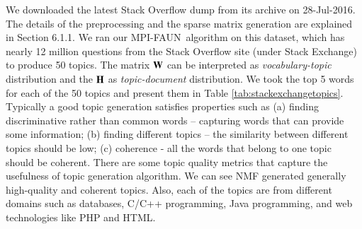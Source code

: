 \documentclass[10pt,journal,compsoc, onecolumn]{IEEEtran}
\newcommand{\ParNMF}{MPI-FAUN}
\begin{document}
We downloaded the latest Stack Overflow  dump from its archive on 28-Jul-2016. The details of 
the preprocessing and the sparse matrix generation are explained in Section 6.1.1. We ran 
our \ParNMF\ algorithm on this dataset, which has nearly 12 million questions from the Stack Overflow site (under Stack Exchange) to produce 50 topics. 
The matrix $\mathbf{W}$ can be interpreted as {\em vocabulary-topic} distribution and the 
$\mathbf{H}$ as {\em topic-document} distribution.  We took the top 5 words for each of the 50 topics and 
present them in Table \ref{tab:stackexchangetopics}. Typically a good topic generation satisfies 
properties such as (a) finding discriminative rather than common words -- capturing words that can provide 
some information; (b) finding different topics -- the similarity between different topics should be low; 
(c) coherence - all the words that belong to one topic should be coherent.  There are some topic quality 
metrics \cite{NLGB2010} that capture the usefulness of topic generation algorithm.  We can  see
 NMF generated generally high-quality and coherent topics. 
 Also, each of the topics are from different domains such as 
 databases, C/C++ programming, Java programming, and web technologies like PHP and HTML. 


%
\end{document}
